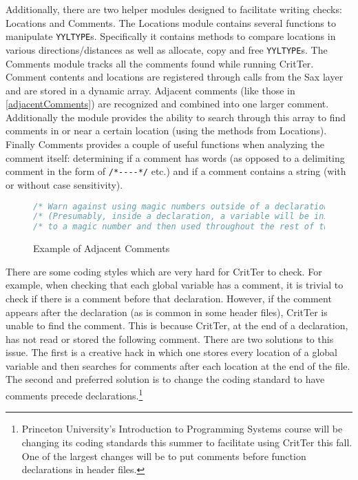 \documentclass[12pt]{report}
\newcommand{\programName}{CritTer\xspace}
\begin{document}
Additionally, there are two helper modules designed to facilitate writing checks: Locations and 
Comments. The Locations module contains several functions to manipulate \lstinline{YYLTYPE}s.  
Specifically it contains methods to compare locations in various directions\slash distances as well as 
allocate, copy and free \lstinline{YYLTYPE}s. The Comments module tracks all the comments found 
while running \programName. Comment contents and locations are registered through calls from the 
Sax layer and are stored in a dynamic array. Adjacent comments (like those in 
\autoref{adjacentComments}) are recognized and combined into one larger comment. Additionally the 
module provides the ability to search through this array to find comments in or near a certain location 
(using the methods from Locations). Finally Comments provides a couple of useful functions when 
analyzing the comment itself: determining if a comment has words (as opposed to a delimiting comment 
in the form of \lstinline{/*----*/} etc.) and if a comment contains a string (with or without case sensitivity).

\begin{figure}
\begin{lstlisting}[language=C]
/* Warn against using magic numbers outside of a declaration.        */
/* (Presumably, inside a declaration, a variable will be initialized */
/* to a magic number and then used throughout the rest of the code). */
\end{lstlisting}
\caption{Example of Adjacent Comments}
\label{adjacentComments}
\end{figure}

There are some coding styles which are very hard for \programName to check. For example, when 
checking that each global variable has a comment, it is trivial to check if there is a comment before that 
declaration. However, if the comment appears after the declaration (as is common in some header 
files), \programName is unable to find the comment. This is because \programName, at the end of a 
declaration, has not read or stored the following comment. There are two solutions to this issue. The 
first is a creative hack in which one stores every location of a global variable and then searches for 
comments after each location at the end of the file. The second and preferred solution is to change the 
coding standard to have comments precede declarations.\footnote{Princeton University's Introduction to 
Programming Systems course\cite{cos217} will be changing its coding standards this summer to 
facilitate using \programName this fall. One of the largest changes will be to put comments before 
function declarations in header files.}
\end{document}
